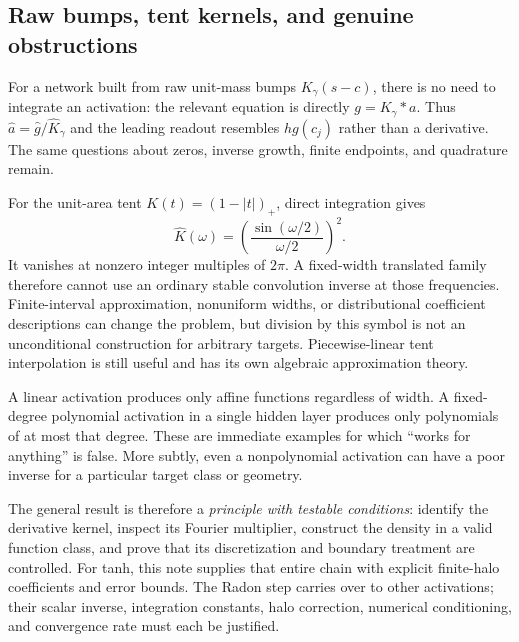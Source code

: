 \documentclass[11pt]{article}
\begin{document}
\subsection{Raw bumps, tent kernels, and genuine obstructions}

For a network built from raw unit-mass bumps $K_\gamma(s-c)$, there is no need to integrate an activation: the relevant equation is directly
$g=K_\gamma*a$. Thus $\widehat a=\widehat g/\widehat K_\gamma$ and the leading readout resembles $h g(c_j)$ rather than a derivative. The same questions about zeros, inverse growth, finite endpoints, and quadrature remain.

For the unit-area tent $K(t)=(1-|t|)_+$, direct integration gives
\[
 \widehat K(\omega)=\left(\frac{\sin(\omega/2)}{\omega/2}\right)^2.
\]
It vanishes at nonzero integer multiples of $2\pi$. A fixed-width translated family therefore cannot use an ordinary stable convolution inverse at those frequencies. Finite-interval approximation, nonuniform widths, or distributional coefficient descriptions can change the problem, but division by this symbol is not an unconditional construction for arbitrary targets. Piecewise-linear tent interpolation is still useful and has its own algebraic approximation theory.

A linear activation produces only affine functions regardless of width. A fixed-degree polynomial activation in a single hidden layer produces only polynomials of at most that degree. These are immediate examples for which ``works for anything'' is false. More subtly, even a nonpolynomial activation can have a poor inverse for a particular target class or geometry.

The general result is therefore a \emph{principle with testable conditions}: identify the derivative kernel, inspect its Fourier multiplier, construct the density in a valid function class, and prove that its discretization and boundary treatment are controlled. For tanh, this note supplies that entire chain with explicit finite-halo coefficients and error bounds. The Radon step carries over to other activations; their scalar inverse, integration constants, halo correction, numerical conditioning, and convergence rate must each be justified.
\end{document}
